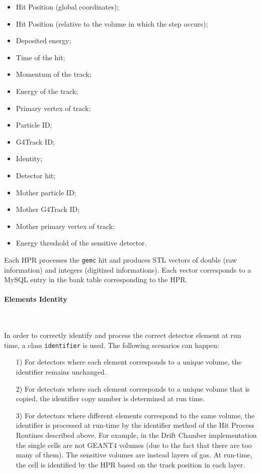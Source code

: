 \begin{itemize}
\item Hit Position (global coordinates);
\item Hit Position (relative to the volume in which the step occurs);
\item Deposited energy;
\item Time of the hit;
\item Momentum of the track;
\item Energy of the track;
\item Primary vertex of track;
\item Particle ID;
\item G4Track ID;
\item Identity;
\item Detector hit;
\item Mother particle ID;
\item Mother G4Track ID;
\item Mother primary vertex of track;
\item Energy threshold of the sensitive detector.
\end{itemize}

Each HPR processes the {\tt gemc} hit and produces STL vectors of double 
(raw information) and integers (digitized informations).  Each vector 
corresponds to a MySQL entry in the bank table corresponding to the HPR. 

\paragraph{Elements Identity}

~~

\vskip 0.3cm

In order to correctly identify and process the correct detector 
element at run time, a class {\tt identifier} is used.  The following 
scenarios can happen:

\begin{itemize}

\item[1)] For detectors where each element corresponds to a unique volume, 
the identifier remains unchanged.
\item[2)] For detectors where each element corresponds to a unique volume 
that is copied, the identifier copy number is determined at run time.
\item[3)] For detectors where different elements correspond to the same 
volume, the identifier is processed at run-time by the identifier method of 
the Hit Process Routines described above. For example, in the Drift Chamber 
implementation the single cells are not GEANT4 volumes (due to the fact that 
there are too many of them).  The sensitive volumes are instead layers of gas. 
At run-time, the cell is identified by the HPR based on the track position in 
each layer.
\end{itemize}

